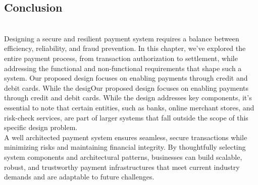 \subsection{Conclusion}\label{SfvIAwjza6302gP02GWjL}
\\
Designing a secure and resilient payment system requires a balance between efficiency, reliability, and fraud prevention. In this chapter, we've explored the entire payment process, from transaction authorization to settlement, while addressing the functional and non-functional requirements that shape such a system. Our proposed design focuses on enabling payments through credit and debit cards. While the desigOur proposed design focuses on enabling payments through credit and debit cards. While the design addresses key components, it's essential to note that certain entities, such as banks, online merchant stores, and risk-check services, are part of larger systems that fall outside the scope of this specific design problem.\\
A well architected payment system ensures seamless, secure transactions while minimizing risks and maintaining financial integrity. By thoughtfully selecting system components and architectural patterns, businesses can build scalable, robust, and trustworthy payment infrastructures that meet current industry demands and are adaptable to future challenges.

